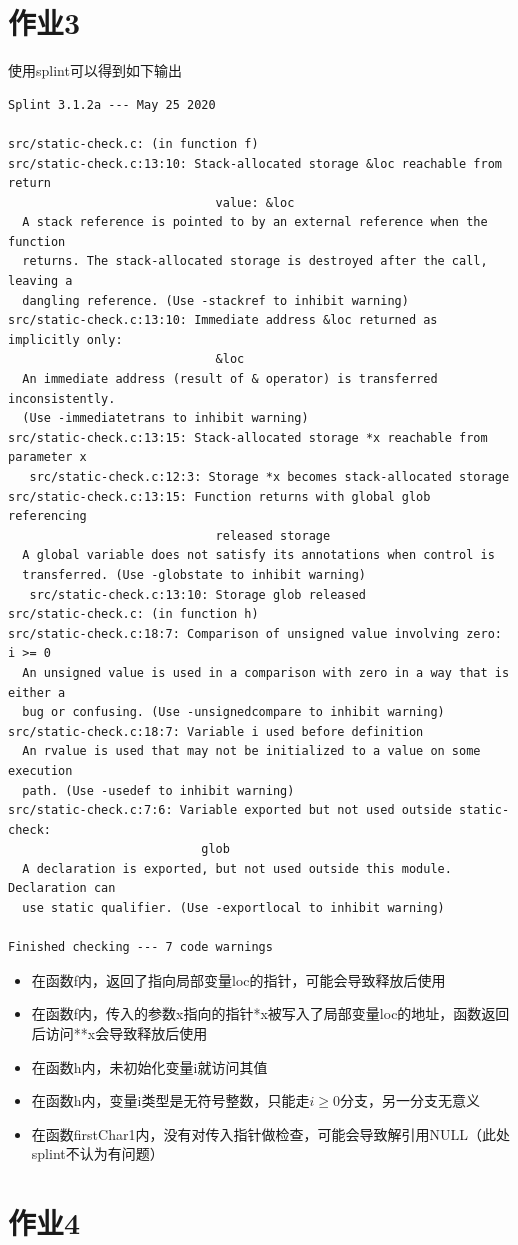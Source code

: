 \documentclass[UTF8,a4paper,10pt]{ctexart}
\begin{document}
\section{作业3}
使用splint可以得到如下输出
\begin{verbatim}
Splint 3.1.2a --- May 25 2020

src/static-check.c: (in function f)
src/static-check.c:13:10: Stack-allocated storage &loc reachable from return
                             value: &loc
  A stack reference is pointed to by an external reference when the function
  returns. The stack-allocated storage is destroyed after the call, leaving a
  dangling reference. (Use -stackref to inhibit warning)
src/static-check.c:13:10: Immediate address &loc returned as implicitly only:
                             &loc
  An immediate address (result of & operator) is transferred inconsistently.
  (Use -immediatetrans to inhibit warning)
src/static-check.c:13:15: Stack-allocated storage *x reachable from parameter x
   src/static-check.c:12:3: Storage *x becomes stack-allocated storage
src/static-check.c:13:15: Function returns with global glob referencing
                             released storage
  A global variable does not satisfy its annotations when control is
  transferred. (Use -globstate to inhibit warning)
   src/static-check.c:13:10: Storage glob released
src/static-check.c: (in function h)
src/static-check.c:18:7: Comparison of unsigned value involving zero: i >= 0
  An unsigned value is used in a comparison with zero in a way that is either a
  bug or confusing. (Use -unsignedcompare to inhibit warning)
src/static-check.c:18:7: Variable i used before definition
  An rvalue is used that may not be initialized to a value on some execution
  path. (Use -usedef to inhibit warning)
src/static-check.c:7:6: Variable exported but not used outside static-check:
                           glob
  A declaration is exported, but not used outside this module. Declaration can
  use static qualifier. (Use -exportlocal to inhibit warning)

Finished checking --- 7 code warnings
\end{verbatim}
\begin{itemize}
  \item 在函数f内，返回了指向局部变量loc的指针，可能会导致释放后使用
  \item 在函数f内，传入的参数x指向的指针*x被写入了局部变量loc的地址，函数返回后访问**x会导致释放后使用
  \item 在函数h内，未初始化变量i就访问其值
  \item 在函数h内，变量i类型是无符号整数，只能走$i \geq 0$分支，另一分支无意义
  \item 在函数firstChar1内，没有对传入指针做检查，可能会导致解引用NULL（此处splint不认为有问题）
\end{itemize}

\section{作业4}
\end{document}
